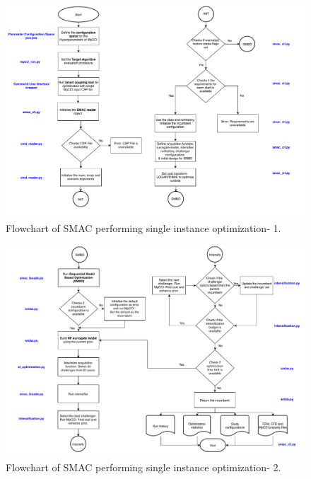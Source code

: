 \begin{figure}[!ht]
\centering
\includegraphics[width=\textwidth,height=0.6\textheight]{images/Flowchart_SMAC-1.pdf}
\captionsetup{justification=justified}
\caption[Flowchart of SMAC- Part 1]{Flowchart of SMAC performing single instance optimization- 1.}
\label{fig:flowchart-smac1}
\end{figure}

\begin{figure}[!ht]
\centering
\includegraphics[width=\textwidth,height=0.6\textheight]{images/Flowchart_SMAC-2.pdf}
\captionsetup{justification=justified}
\caption[Flowchart of SMAC- Part 2]{Flowchart of SMAC performing single instance optimization- 2.}
\label{fig:flowchart-smac2}
\end{figure}

